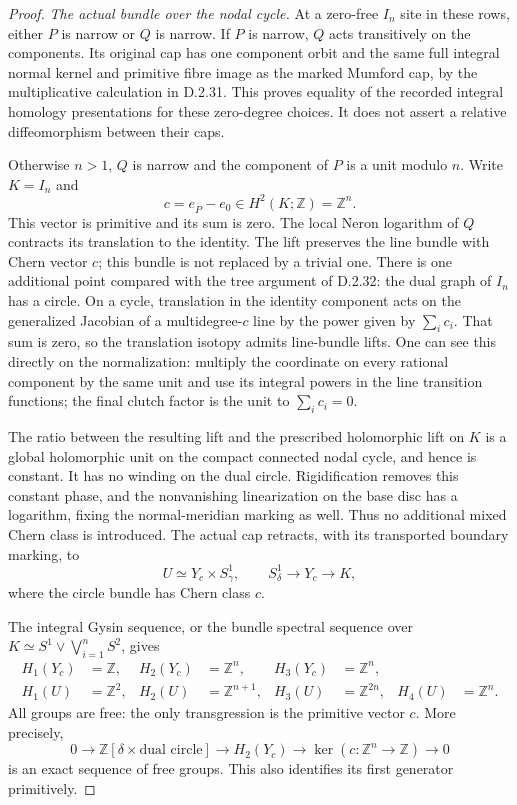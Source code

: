 \begin{proof}
\emph{The actual bundle over the nodal cycle.}
At a zero-free $I_n$ site in these rows, either $P$ is
narrow or $Q$ is narrow. If $P$ is narrow, $Q$ acts
transitively on the components. Its original cap has
one component orbit and the same full integral normal
kernel and primitive fibre image as the marked Mumford
cap, by the multiplicative calculation in D.2.31.
This proves equality of the recorded integral homology
presentations for these zero-degree choices. It does not
assert a relative diffeomorphism between their caps.

Otherwise $n>1$, $Q$ is narrow and the component of $P$
is a unit modulo $n$. Write $K=I_n$ and
\[
 c=e_{\overline P}-e_0\in H^2(K;\mathbb Z)=\mathbb Z^n .
\]
This vector is primitive and its sum is zero. The local
Neron logarithm of $Q$ contracts its translation to the
identity. The lift preserves the line bundle with Chern
vector $c$; this bundle is not replaced by a trivial one.
There is one additional point compared with the tree
argument of D.2.32: the dual graph of $I_n$ has a circle.
On a cycle, translation in the identity component acts
on the generalized Jacobian of a multidegree-$c$ line
by the power given by $\sum_i c_i$. That sum is zero,
so the translation isotopy admits line-bundle lifts.
One can see this directly on the normalization: multiply
the coordinate on every rational component by the same
unit and use its integral powers in the line transition
functions; the final clutch factor is the unit to
$\sum_i c_i=0$.

The ratio between the resulting lift and the prescribed
holomorphic lift on $K$ is a global holomorphic unit on
the compact connected nodal cycle, and hence is constant.
It has no winding on the dual circle. Rigidification
removes this constant phase, and the nonvanishing
linearization on the base disc has a logarithm, fixing
the normal-meridian marking as well. Thus no additional
mixed Chern class is introduced. The actual cap retracts,
with its transported boundary marking, to
\[
 U\simeq Y_c\times S^1_\gamma,\qquad
 S^1_\delta\longrightarrow Y_c\longrightarrow K,           \tag{D.OM3}
\]
where the circle bundle has Chern class $c$.

The integral Gysin sequence, or the bundle spectral
sequence over $K\simeq S^1\vee\bigvee_{i=1}^nS^2$, gives
\[
\begin{aligned}
 H_1(Y_c)&=\mathbb Z,&
 H_2(Y_c)&=\mathbb Z^n,&
 H_3(Y_c)&=\mathbb Z^n,\\
 H_1(U)&=\mathbb Z^2,&
 H_2(U)&=\mathbb Z^{n+1},&
 H_3(U)&=\mathbb Z^{2n},&
 H_4(U)&=\mathbb Z^n .
\end{aligned}                                             \tag{D.OM4}
\]
All groups are free: the only transgression is the
primitive vector $c$. More precisely,
\[
 0\longrightarrow\mathbb Z[\delta\times\text{dual circle}]
 \longrightarrow H_2(Y_c)
 \longrightarrow\ker(c:\mathbb Z^n\to\mathbb Z)
 \longrightarrow0                                        \tag{D.OM5}
\]
is an exact sequence of free groups. This also identifies
its first generator primitively.


\end{proof}
